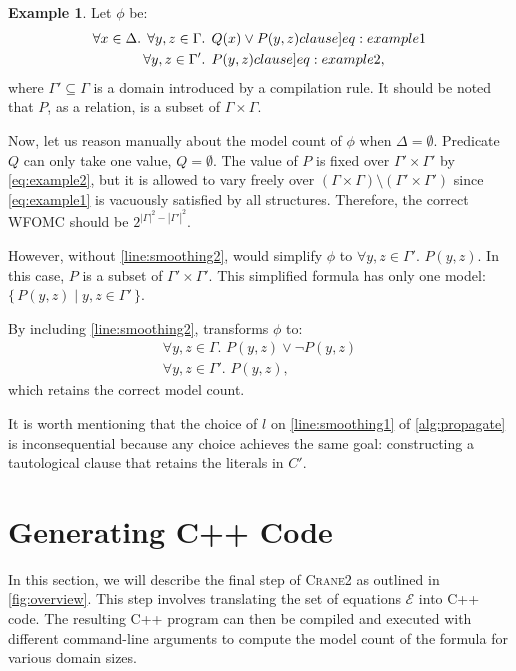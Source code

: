 \documentclass[letterpaper]{article} %
\theoremstyle{remark}
\theoremstyle{definition}
\newtheorem{example}{Example}
\newcommand{\Cranetwo}{\textsc{Crane2}}
\begin{document}
\begin{example}\label{example:basecasesmoothing}
  Let $\phi$ be:
  \begin{align}
    \forall x \in \Delta\text{. }\forall y, z \in \Gamma&\text{. }Q(x) \lor P(y, z)\label[clause]{eq:example1}\\
    \forall y, z \in \Gamma'&\text{. }P(y, z)\label[clause]{eq:example2},
  \end{align}
  where $\Gamma' \subseteq \Gamma$ is a domain introduced by a compilation rule.
  It should be noted that $P$, as a relation, is a subset of
  $\Gamma \times \Gamma$.

  Now, let us reason manually about the model count of $\phi$ when
  $\Delta = \emptyset$. Predicate $Q$ can only take one value, $Q = \emptyset$.
  The value of $P$ is fixed over $\Gamma' \times \Gamma'$ by \cref{eq:example2},
  but it is allowed to vary freely over
  $(\Gamma \times \Gamma) \setminus (\Gamma' \times \Gamma')$ since
  \cref{eq:example1} is vacuously satisfied by all structures. Therefore, the
  correct WFOMC should be $2^{|\Gamma|^2 - |\Gamma'|^2}$.

  However, without \cref{line:smoothing2}, \Propagate would simplify $\phi$ to
  $\forall y, z \in \Gamma'\text{. }P(y, z)$. In this case, $P$ is a subset of
  $\Gamma' \times \Gamma'$. This simplified formula has only one model:
  $\{\, P(y, z) \mid y, z \in \Gamma' \,\}$.

  By including \cref{line:smoothing2}, \Propagate transforms $\phi$ to:
  \begin{gather*}
    \forall y, z \in \Gamma\text{. }P(y, z) \lor \neg P(y, z)\\
    \forall y, z \in \Gamma'\text{. }P(y, z),
  \end{gather*}
  which retains the correct model count.
\end{example}

It is worth mentioning that the choice of $l$ on \cref{line:smoothing1} of
\cref{alg:propagate} is inconsequential because any choice achieves the same
goal: constructing a tautological clause that retains the literals in $C'$.

\section{Generating C++ Code}\label{sec:cpp}

In this section, we will describe the final step of \Cranetwo{} as outlined in
\cref{fig:overview}. This step involves translating the set of equations
$\mathcal{E}$ into C++ code. The resulting C++ program can then be compiled and
executed with different command-line arguments to compute the model count of the
formula for various domain sizes.
\end{document}
